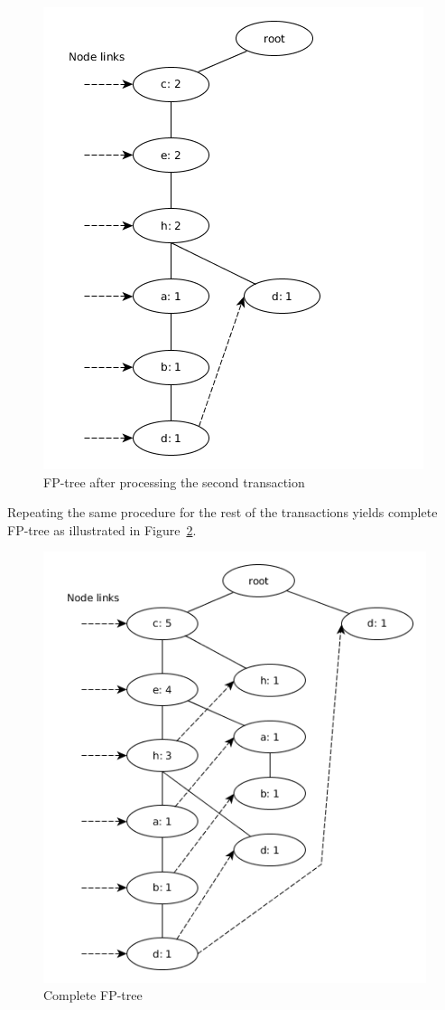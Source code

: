 \begin{figure}[!htbp]
	\centering
	\includegraphics[scale=0.5]{fp-tree-example/fp-tree-p2.png}
	\caption{FP-tree after processing the second transaction}
	\label{figure:fp-growth-example2}
\end{figure}

Repeating the same procedure for the rest of the transactions yields complete FP-tree as illustrated in Figure~\ref{figure:fp-growth-example3}.

\begin{figure}[!htbp]
	\centering
	\includegraphics[scale=0.5]{fp-tree-example/fp-tree-p3.png}
	\caption{Complete FP-tree}
	\label{figure:fp-growth-example3}
\end{figure}

